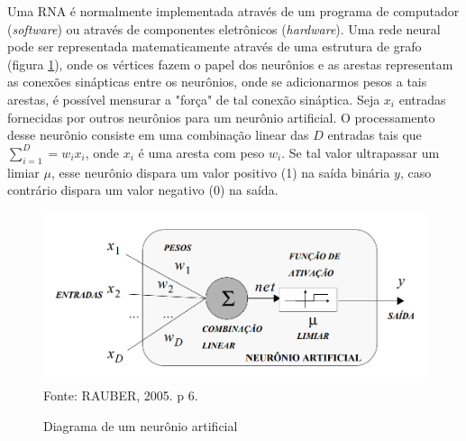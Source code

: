 Uma RNA é normalmente implementada através de um programa de computador (\textit{software}) ou através de componentes eletrônicos (\textit{hardware}). Uma rede neural pode ser representada matematicamente através de uma estrutura de grafo (figura \ref{fig:graphNeuron}), onde os vértices fazem o papel dos neurônios e as arestas representam as conexões sinápticas entre os neurônios, onde se adicionarmos pesos a tais arestas, é possível mensurar a "força" de tal conexão sináptica. Seja $x_i$ entradas fornecidas por outros neurônios para um neurônio artificial. O processamento desse neurônio consiste em uma combinação linear das $D$ entradas tais que $\sum_{i=1}^{D} = w_i x_i$, onde $x_i$ é uma aresta com peso $w_i$. Se tal valor ultrapassar um limiar $\mu$, esse neurônio dispara um valor positivo (1) na saída binária $y$, caso contrário dispara um valor negativo (0) na saída. 

\begin{figure}[ht!]
\caption{Diagrama de um neurônio artificial}
\label{fig:graphNeuron}
\centering
\includegraphics[scale=0.5]{img/graphNeuron.png}
{\fontsize{11pt}{\baselineskip}\selectfont
\\Fonte: RAUBER, 2005. p 6.
}
\end{figure}